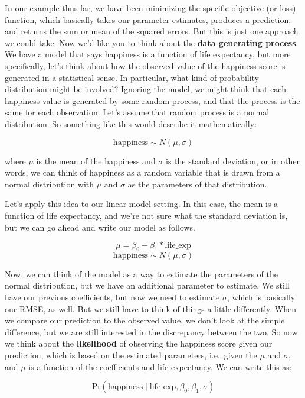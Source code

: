\documentclass[
  letterpaper,
]{krantz}
\begin{document}
In our example thus far, we have been minimizing the specific objective
(or loss) function, which basically takes our parameter estimates,
produces a prediction, and returns the sum or mean of the squared
errors. But this is just one approach we could take. Now we'd like you
to think about the \textbf{data generating process}. We have a model
that says happiness is a function of life expectancy, but more
specifically, let's think about how the observed value of the happiness
score is generated in a statistical sense. In particular, what kind of
probability distribution might be involved? Ignoring the model, we might
think that each happiness value is generated by some random process, and
that the process is the same for each observation. Let's assume that
random process is a normal distribution. So something like this would
describe it mathematically:

\[
\textrm{happiness} \sim N(\mu, \sigma)
\]

where \(\mu\) is the mean of the happiness and \(\sigma\) is the
standard deviation, or in other words, we can think of happiness as a
random variable that is drawn from a normal distribution with \(\mu\)
and \(\sigma\) as the parameters of that distribution.

Let's apply this idea to our linear model setting. In this case, the
mean is a function of life expectancy, and we're not sure what the
standard deviation is, but we can go ahead and write our model as
follows.

\[
\mu = \beta_0 + \beta_1 * \textrm{life\_exp}
\] \[
\textrm{happiness} \sim N(\mu, \sigma)
\]

Now, we can think of the model as a way to estimate the parameters of
the normal distribution, but we have an additional parameter to
estimate. We still have our previous coefficients, but now we need to
estimate \(\sigma\), which is basically our RMSE, as well. But we still
have to think of things a little differently. When we compare our
prediction to the observed value, we don't look at the simple
difference, but we are still interested in the discrepancy between the
two. So now we think about the \textbf{likelihood} of observing the
happiness score given our prediction, which is based on the estimated
parameters, i.e.~given the \(\mu\) and \(\sigma\), and \(\mu\) is a
function of the coefficients and life expectancy. We can write this as:

\[
\textrm{Pr}(\textrm{happiness} \mid \textrm{life\_exp}, \beta_0, \beta_1, \sigma)
\]
\end{document}
